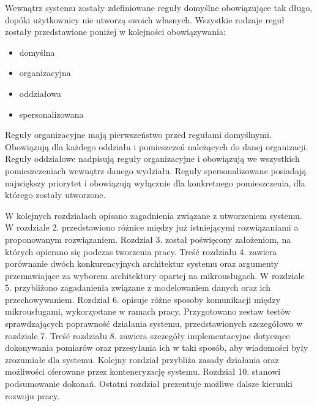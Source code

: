 Wewnątrz systemu zostały zdefiniowane reguły domyślne obowiązujące tak długo, dopóki
użytkownicy nie utworzą swoich własnych. Wszystkie rodzaje reguł zostały przedstawione 
poniżej w kolejności obowiązywania:

\begin{itemize}
    \item domyślna
    \item organizacyjna
    \item oddziałowa
    \item spersonalizowana
\end{itemize}

Reguły organizacyjne mają pierwszeństwo przed regułami domyślnymi. Obowiązują dla
każdego oddziału i pomieszczeń należących do danej organizacji. Reguły oddziałowe
nadpisują reguły organizacyjne i obowiązują we wszystkich pomieszczeniach wewnątrz
danego wydziału. Reguły spersonalizowane posiadają największy priorytet i obowiązują
wyłącznie dla konkretnego pomieszczenia, dla którego zostały utworzone.

W kolejnych rozdziałach opisano zagadnienia związane z utworzeniem systemu. W rozdziale 2. 
przedstawiono różnice między już istniejącymi rozwiązaniami a proponowanym rozwiązaniem. 
Rozdział 3. został poświęcony założeniom, na których opierano się podczas tworzenia pracy. 
Treść rozdziału 4. zawiera porównanie dwóch konkurencyjnych architektur systemu oraz
argumenty przemawiające za wyborem architektury opartej na mikrousługach.
W rozdziale 5. przybliżono zagadanienia związane z modelowaniem danych oraz ich 
przechowywaniem. Rozdział 6. opisuje różne sposoby komunikacji między 
mikrousługami, wykorzystane w ramach pracy. Przygotowano zestaw testów sprawdzających
poprawność działania systemu, przedstawionych szczegółowo w rozdziale 7.
Treść rozdziału 8. zawiera szczegóły implementacyjne dotyczące dokonywania pomiarów
oraz przesyłania ich w taki sposób, aby wiadomości były zrozumiałe dla systemu.
Kolejny rozdział przybliża zasady działania oraz możliwości oferowane przez konteneryzację
systemu. Rozdział 10. stanowi podsumowanie dokonań. Ostatni rozdział prezentuje możliwe
dalsze kierunki rozwoju pracy.